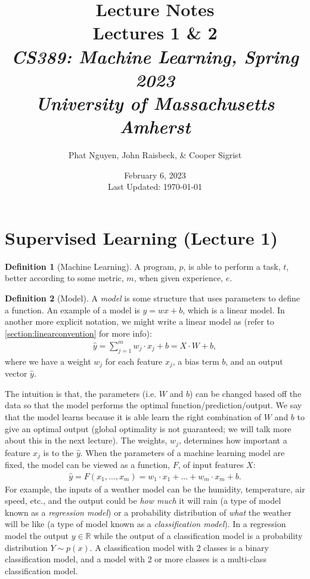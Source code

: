 \documentclass[11pt]{article}
\numberwithin{equation}{section}
\theoremstyle{definition}%
\newtheorem{definition}{Definition}[section]%
\begin{document}
\title{Lecture Notes\\\vspace{1ex}
\large Lectures 1 \& 2\\
\normalsize \emph{CS389: Machine Learning, Spring 2023}\\
\emph{University of Massachusetts Amherst}}
\author{\smallheader Phat Nguyen, John Raisbeck, \& Cooper Sigrist}
\date{\smallheader February 6, 2023\\
Last Updated: \today}
\maketitle


\section{Supervised Learning (Lecture 1)}
\begin{definition}[Machine Learning]
    A program, $p$, is able to perform a task, $t$, better according to some metric, $m$, when given experience, $e$.
\end{definition}
\begin{definition}[Model]
A \emph{model} is some structure that uses parameters to define a function. An example of a model is $y= wx + b$, which is a linear model. In another more explicit notation, we might write a linear model as (refer to \autoref{section:linearconvention} for more info):
\begin{align}
    \hat{y} = \sum_{j=1}^{m}{w_j \cdot x_j + b} = X \cdot W + b,
\end{align}
where we have a weight $w_j$ for each feature $x_j$, a bias term $b$, and an output vector $\hat{y}$. 
\end{definition}

The intuition is that, the parameters (i.e. $W$ and $b$) can be changed based off the data so that the model performs the optimal function/prediction/output. We say that the model learns because it is able learn the right combination of $W$ and $b$ to give an optimal output (global optimality is not guaranteed; we will talk more about this in the next lecture). The weights, $w_j$, determines how important a feature $x_j$ is to the $\hat{y}$. When the parameters of a machine learning model are fixed, the model can be viewed as a function, $F$, of input features $X$:
\begin{align}
    \hat{y} = F(x_1, ..., x_m) = w_1 \cdot x_1 + ... + w_m \cdot x_m + b.
\end{align}
For example, the inputs of a weather model can be the humidity, temperature, air speed, etc., and the output could be \emph{how much} it will rain (a type of model known as a \emph{regression model}) or a probability distribution of \emph{what} the weather will be like (a type of model known as a \emph{classification model}). In a regression model the output $y \in \mathbb{R}$ while the output of a classification model is a probability distribution $Y \sim p(x)$. A classification model with 2 classes is a binary classification model, and a model with 2 or more classes is a multi-class classification model.
\end{document}
